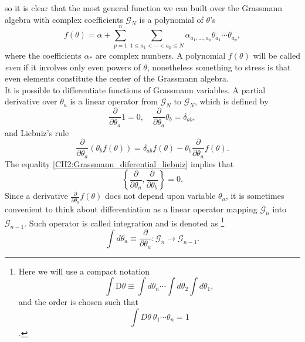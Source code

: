 so it is clear that the most general function we can built over the Grassmann algebra with complex coefficients $\mathcal{G}_{N}$ is  a polynomial of $\theta$'s
\begin{equation}
f(\theta)=\alpha+\sum_{p=1}^{n} \sum_{1 \leq a_{1}<\cdots<a_{p} \leq N} \alpha_{a_{1}, \ldots, a_{p}} \theta_{a_{1}} \cdots \theta_{a_{p}},
\label{CH2:Grassmann_function}
\end{equation}
where the coefficients $\alpha_{*}$ are complex numbers. A polynomial $f(\theta)$ will be called \textit{even} if it involves only even powers of $\theta$, nonetheless something to stress is that even elements constitute the center of the Grassmann algebra.\\
\indent It is possible to differentiate functions of Grassmann variables. A partial derivative over $\theta_{a}$ is a linear operator from $\mathcal{G}_{N}$ to $ \mathcal{G}_{N}$, which is defined by
\begin{equation}
\frac{\partial}{\partial \theta_{a}} 1=0, \quad \frac{\partial}{\partial \theta_{a}} \theta_{b}=\delta_{a b},
\label{CH2:Grassmann_diferential}
\end{equation}
and Liebniz's rule
\begin{equation}
\frac{\partial}{\partial \theta_{a}}\left(\theta_{b} f(\theta)\right)=\delta_{a b} f(\theta)-\theta_{b} \frac{\partial}{\partial \theta_{a}} f(\theta).
\label{CH2:Grassmann_diferential_liebniz}
\end{equation}
\indent The equality \eqref{CH2:Grassmann_diferential_liebniz} implies that 
\begin{equation}
\left\{\frac{\partial}{\partial \theta_{a}}, \frac{\partial}{\partial \theta_{b}}\right\}=0.
\label{CH2:Grassmann_partial_derivative_anticommutation}
\end{equation}
\indent Since a derivative $\frac{\partial}{\partial\theta_{a}}f(\theta)$ does not depend upon variable $\theta_{a}$, it is sometimes convenient to think about differentiation as a linear operator mapping $\mathcal{G}_{n}$ into $\mathcal{G}_{n-1}$. Such operator is called integration and is denoted as\cite{bravyi_lagrangian_2004} \footnote{Here we will use a compact notation \[\int \mathrm{D} \theta \equiv \int d \theta_{n} \cdots \int d \theta_{2} \int d \theta_{1},\] and the order is chosen such that \[\int D\theta\ \theta_1\cdots\theta_n = 1\].
}
\begin{equation}
\int d \theta_{a} \equiv \frac{\partial}{\partial \theta_{a}}: \mathcal{G}_{n} \rightarrow \mathcal{G}_{n-1}.
\label{CH2:Grassmann_Integration_relation}
\end{equation}

